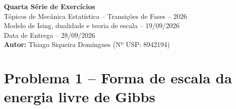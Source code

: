 \documentclass[11pt,a4paper]{article}
\begin{document}
\begin{center}
    {\Large \textbf{Quarta Série de Exercícios}}\\[0.6cm]
    {\large Tópicos de Mecânica Estatística -- Transições de Fases -- 2026}\\[0.2cm]
    {\large Modelo de Ising, dualidade e teoria de escala -- 19/09/2026}\\[0.4cm]
    {\large Data de Entrega -- 28/09/2026}\\[0.2cm]
    {\Large \textbf{Autor:} Thiago Siqueira Domingues (Nº USP: 8942194)}
\end{center}

\vspace{0.3cm}

\section*{Problema 1 -- Forma de escala da energia livre de Gibbs}
\end{document}
